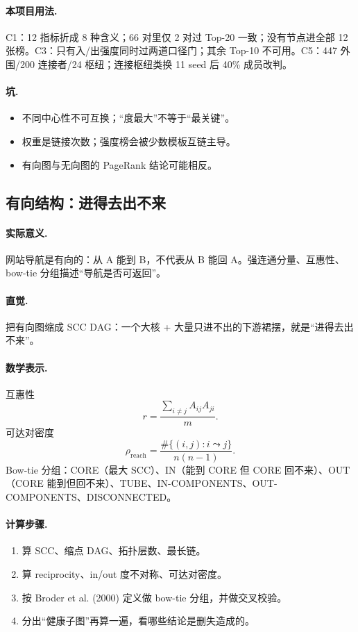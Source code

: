 \paragraph{本项目用法.}
\unit{C1}：12 指标折成 8 种含义；66 对里仅 2 对过 Top-20 一致；没有节点进全部 12 张榜。\unit{C3}：只有入/出强度同时过两道口径门；其余 Top-10 不可用。\unit{C5}：447 外围/200 连接者/24 枢纽；连接枢纽类换 11 seed 后 40\% 成员改判。

\paragraph{坑.}
\begin{itemize}
  \item 不同中心性不可互换；“度最大”不等于“最关键”。
  \item 权重是链接次数；强度榜会被少数模板互链主导。
  \item 有向图与无向图的 PageRank 结论可能相反。
\end{itemize}

\subsection{有向结构：进得去出不来}

\paragraph{实际意义.}
网站导航是有向的：从 A 能到 B，不代表从 B 能回 A。强连通分量、互惠性、bow-tie 分组描述“导航是否可返回”。

\paragraph{直觉.}
把有向图缩成 SCC DAG：一个大核 + 大量只进不出的下游裙摆，就是“进得去出不来”。

\paragraph{数学表示.}
互惠性
\[
r=\frac{\sum_{i\ne j}A_{ij}A_{ji}}{m}.
\]
可达对密度
\[
\rho_{\mathrm{reach}}=\frac{\#\{(i,j):i\leadsto j\}}{n(n-1)}.
\]
Bow-tie 分组：CORE（最大 SCC）、IN（能到 CORE 但 CORE 回不来）、OUT（CORE 能到但回不来）、TUBE、IN-COMPONENTS、OUT-COMPONENTS、DISCONNECTED。

\paragraph{计算步骤.}
\begin{enumerate}
  \item 算 SCC、缩点 DAG、拓扑层数、最长链。
  \item 算 reciprocity、in/out 度不对称、可达对密度。
  \item 按 Broder et al. (2000) 定义做 bow-tie 分组，并做交叉校验。
  \item 分出“健康子图”再算一遍，看哪些结论是删失造成的。
\end{enumerate}

